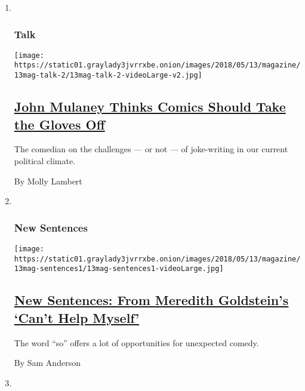 \begin{enumerate}
\def\labelenumi{\arabic{enumi}.}
\item ~
  \hypertarget{talk}{%
  \subsubsection{Talk}\label{talk}}

  \texttt{[image: https://static01.graylady3jvrrxbe.onion/images/2018/05/13/magazine/13mag-talk-2/13mag-talk-2-videoLarge-v2.jpg]}

  \hypertarget{john-mulaney-thinks-comics-should-take-the-gloves-off}{%
  \subsection{\texorpdfstring{\href{/2018/05/08/magazine/john-mulaney-thinks-comics-should-take-the-gloves-off.html}{John
  Mulaney Thinks Comics Should Take the Gloves
  Off}}{John Mulaney Thinks Comics Should Take the Gloves Off}}\label{john-mulaney-thinks-comics-should-take-the-gloves-off}}

  The comedian on the challenges --- or not --- of joke-writing in our
  current political climate.

  By Molly Lambert
\item ~
  \hypertarget{new-sentences}{%
  \subsubsection{New Sentences}\label{new-sentences}}

  \texttt{[image: https://static01.graylady3jvrrxbe.onion/images/2018/05/13/magazine/13mag-sentences1/13mag-sentences1-videoLarge.jpg]}

  \hypertarget{new-sentences-from-meredith-goldsteins-cant-help-myself}{%
  \subsection{\texorpdfstring{\href{/2018/05/09/magazine/new-sentences-from-meredith-goldsteins-cant-help-myself.html}{New
  Sentences: From Meredith Goldstein's `Can't Help
  Myself'}}{New Sentences: From Meredith Goldstein's `Can't Help Myself'}}\label{new-sentences-from-meredith-goldsteins-cant-help-myself}}

  The word ``so'' offers a lot of opportunities for unexpected comedy.

  By Sam Anderson
\item ~
  \hypertarget{issue-51318}{%
}
\end{enumerate}
